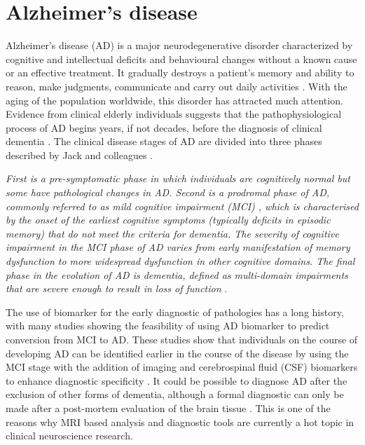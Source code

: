 \section{Alzheimer's disease} Alzheimer's disease (AD) is a major neurodegenerative disorder characterized by cognitive and intellectual deficits and behavioural changes without a known cause or an effective treatment. It gradually destroys a patient's memory and ability to reason, make judgments, communicate and carry out daily activities \citep{Jeong2004}. With the aging of the population worldwide, this disorder has attracted much attention. Evidence from clinical elderly individuals suggests that the pathophysiological process of AD begins years, if not decades, before the diagnosis of clinical dementia \citep{Morris2005}. The clinical disease stages of AD are divided into three phases described by Jack and colleagues \cite{Jack2010}. 

\textit{First is a pre-symptomatic phase in which individuals are cognitively normal but some have pathological changes in AD. Second is a prodromal phase of AD, commonly referred to as mild cognitive impairment (MCI) \citep{Petersen2004}, which is characterised by the 
onset of the earliest cognitive symptoms (typically deficits in episodic memory) that do not meet the criteria for dementia. The severity of cognitive impairment in the MCI phase of AD varies from early manifestation of memory dysfunction to more widespread dysfunction in other cognitive domains. The final phase in the evolution of AD is dementia, defined as multi-domain impairments that are severe enough to result in loss of function} \citep{Jack2010}.

The use of biomarker for the early diagnostic of pathologies has a long history, with many studies showing the feasibility of using AD biomarker to predict conversion from MCI to AD. These studies show that individuals on the course of developing AD can be identified earlier in the course of the disease by using the MCI stage with the addition of imaging and cerebrospinal fluid (CSF) biomarkers to enhance diagnostic specificity \citep{Chetelat2003,Jack1999,Yuan2009,Mattsson2009}. 
It could be possible to diagnose AD after the exclusion of other forms of dementia, although a formal diagnostic can only be made after a post-mortem evaluation of the brain tissue \citep{McKhann1984}. This is one of the reasons why MRI based analysis and diagnostic tools are currently a hot topic in clinical neuroscience research.

